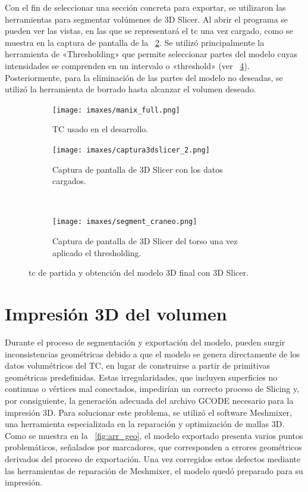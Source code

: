 Con el fin de seleccionar una sección concreta para exportar, se utilizaron las herramientas para segmentar volúmenes de 3D Slicer.
Al abrir el programa se pueden ver las vistas, en las que se representará el \acrshort{tc} una vez cargado, como se muestra en la captura de pantalla de la \figurename~\ref{fig:3dslier}.
Se utilizó principalmente la herramienta de «Thresholding» que permite seleccionar partes del modelo cuyas intensidades se comprenden en un intervalo o «threshold» (ver \figurename~\ref{fig:seg_cr}). Posteriormente, para la eliminación de las partes del modelo no deseadas, se utilizó la herramienta de borrado hasta alcanzar el volumen deseado.

\begin{figure}
	\centering
	\begin{subfigure}{.4\textwidth}
		\texttt{[image: imaxes/manix\_full.png]}
		\caption{TC usado en el desarrollo.}\label{fig:manix_full}
	\end{subfigure}
	\begin{minipage}[b]{.47\textwidth}
		\begin{subfigure}{\textwidth}
			\centering
			\texttt{[image: imaxes/captura3dslicer\_2.png]}
			\caption{ Captura de pantalla de 3D Slicer con los datos cargados.}\label{fig:3dslier}
		\end{subfigure}\\
		\begin{subfigure}{\textwidth}
			\centering
			\texttt{[image: imaxes/segment\_craneo.png]}
			\caption{ Captura de pantalla de 3D Slicer del torso una vez aplicado el thresholding.}\label{fig:seg_cr}
		\end{subfigure}
	\end{minipage}
	\caption{\acrshort{tc} de partida y obtención del modelo 3D final con 3D Slicer.}
\end{figure}

\section{Impresión 3D del volumen}
Durante el proceso de segmentación y exportación del modelo, pueden surgir inconsistencias geométricas debido a que el modelo se genera directamente de los datos volumétricos del TC, en lugar de construirse a partir de primitivas geométricas predefinidas. Estas irregularidades, que incluyen superficies no continuas o vértices mal conectados, impedirían un correcto proceso de Slicing y, por consiguiente, la generación adecuada del archivo GCODE necesario para la impresión 3D. Para solucionar este problema, se utilizó el software Meshmixer, una herramienta especializada en la reparación y optimización de mallas 3D. Como se muestra en la \figurename~\ref{fig:arr_geo}, el modelo exportado presenta varios puntos problemáticos, señalados por marcadores, que corresponden a errores geométricos derivados del proceso de exportación. Una vez corregidos estos defectos mediante las herramientas de reparación de Meshmixer, el modelo quedó preparado para su impresión.

